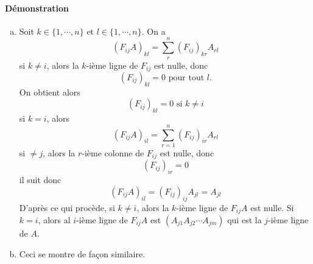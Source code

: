 \paragraph{Démonstration}
\begin{enumerate}[a)]
  \item Soit $k\in\{1,\cdots,n\}$ et $l\in\{1,\cdots,n\}$. On a
$$(F_{ij}A)_{k l}=\sum\limits_{r}^n{(F_{i j})_{k r}A_{r l}}$$
si $k\neq i$, alors la $k$-ième ligne de $F_{i j}$ est nulle, donc
$$(F_{i j})_{k l}=0 \text{ pour tout } l \text{.}$$
On obtient alors
$$(F_{i j})_{k l}=0 \text{ si } k\neq i$$
si $k=i$, alors 
$$(F_{i j}A)_{i l}= \sum\limits_{r=1}^n{(F_{i j})_{i r}A_{r l}}$$
si $\neq j$, alors la $r$-ième colonne de $F_{i j}$ est nulle, donc
$$(F_{ij})_{i r}=0$$
il suit donc
$$(F_{i j}A)_{i l}= (F_{i j})_{i j}A_{j l}=A_{j l}$$
D'après ce qui procède, si $k\neq i$, alors la $k$-ième ligne de $F_{i j}A$ est nulle. Si $k=i$, alors al $i$-ième ligne de $F_{i j}A$ est $(A_{j 1}A_{j 2}\cdots A_{j m})$ qui est la $j$-ième ligne de $A$.
  \item Ceci se montre de façon similaire.
\end{enumerate}

